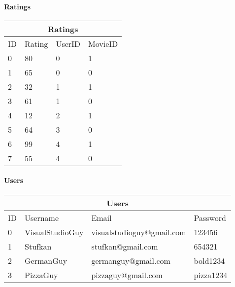 \paragraph{Ratings}

\begin{center}
\begin{tabular}{|l|l|l|l|}
\hline
\multicolumn{4}{|c|}{Ratings} \\ \hline
ID & Rating & UserID & MovieID \\ \hline \hline
0 & 80 & 0 & 1 \\ \hline
1 & 65 & 0 & 0 \\ \hline
2 & 32 & 1 & 1 \\ \hline
3 & 61 & 1 & 0 \\ \hline
4 & 12 & 2 & 1 \\ \hline
5 & 64 & 3 & 0 \\ \hline
6 & 99 & 4 & 1 \\ \hline
7 & 55 & 4 & 0 \\ \hline
\end{tabular}
\end{center}

\paragraph{Users}

\begin{center}
\begin{tabular}{|l|l|l|l|}
\hline
\multicolumn{4}{|c|}{Users} \\ \hline
ID & Username & Email & Password \\ \hline \hline
0 & VisualStudioGuy & visualstudioguy@gmail.com & 123456 \\ \hline
1 & Stufkan & stufkan@gmail.com & 654321 \\ \hline
2 & GermanGuy & germanguy@gmail.com & bold1234 \\ \hline
3 & PizzaGuy & pizzaguy@gmail.com & pizza1234 \\ \hline
\end{tabular}
\end{center}

